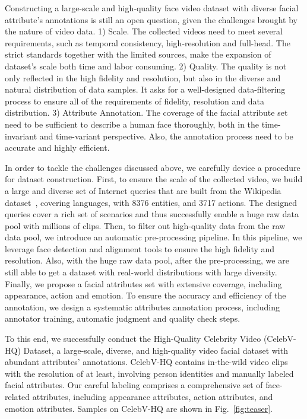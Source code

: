 \documentclass[runningheads]{llncs}
\begin{document}
Constructing a large-scale and high-quality face video dataset with diverse facial attribute's annotations is still an open question, given the challenges brought by the nature of video data.
1) Scale. The collected videos need to meet several requirements, such as temporal consistency, high-resolution and full-head. The strict standards together with the limited sources, make the expansion of dataset's scale both time and labor consuming.
2) Quality. The quality is not only reflected in the high fidelity and resolution, but also in the diverse and natural distribution of data samples. It asks for a well-designed data-filtering process to ensure all of the requirements of fidelity, resolution and data distribution.
3) Attribute Annotation. The coverage of the facial attribute set need to be sufficient to  describe a human face thoroughly, both in the time-invariant and time-variant perspective. Also, the annotation process need to be accurate and highly efficient.





In order to tackle the challenges discussed above, we carefully device a procedure for dataset construction.
First, to ensure the scale of the collected video, we build a large and diverse set of Internet queries that are built from the Wikipedia dataset~\cite{wikidataset}, covering  languages, with 8376 entities, and 3717 actions. The designed queries cover a rich set of scenarios and thus successfully enable a huge raw data pool with millions of clips.
Then, to filter out high-quality data from the raw data pool, we introduce an automatic pre-processing pipeline. In this pipeline, we leverage face detection and alignment tools to ensure the high fidelity and resolution. Also, with the huge raw data pool, after the pre-processing, we are still able to get a dataset with real-world distributions with large diversity.
Finally, we propose a facial attributes set with extensive coverage, including appearance, action and emotion.
To ensure the accuracy and efficiency of the annotation, we design a systematic attributes annotation process, including annotator training, automatic judgment and quality check steps.

To this end, we successfully conduct the High-Quality Celebrity Video (CelebV-HQ) Dataset, a large-scale, diverse, and high-quality video facial dataset with abundant attributes' annotations.
CelebV-HQ contains  in-the-wild video clips with the resolution of  at least, involving  person identities and  manually labeled facial attributes.
Our careful labeling comprises a comprehensive set of face-related attributes, including  appearance attributes,  action attributes, and  emotion attributes. Samples on CelebV-HQ are shown in Fig.~\ref{fig:teaser}.
\end{document}
